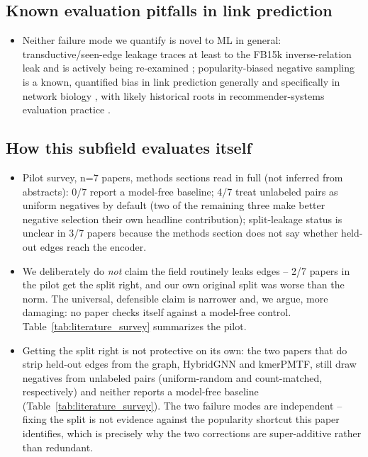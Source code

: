 \documentclass{bmcart}
\begin{document}
\subsection*{Known evaluation pitfalls in link prediction}
\begin{itemize}
\item Neither failure mode we quantify is novel to ML in general: transductive/seen-edge
leakage traces at least to the FB15k inverse-relation leak \cite{toutanova2015observed}
and is actively being re-examined \cite{zhu2023pitfalls,li2023evaluating};
popularity-biased negative sampling is a known, quantified bias in link prediction
generally \cite{kotnis2017analysis,aiyappa2024implicit} and specifically in network
biology \cite{yilmaz2025biasaware}, with likely historical roots in recommender-systems
evaluation practice \cite{krichene2020sampled}.
\end{itemize}

\subsection*{How this subfield evaluates itself}
\begin{itemize}
\item Pilot survey, n=7 papers, methods sections read in full (not inferred from
abstracts): 0/7 report a model-free baseline; 4/7 treat unlabeled pairs as uniform
negatives by default (two of the remaining three make better negative selection their
own headline contribution); split-leakage status is unclear in 3/7 papers because the
methods section does not say whether held-out edges reach the encoder.
\item We deliberately do \emph{not} claim the field routinely leaks edges -- 2/7 papers
in the pilot get the split right, and our own original split was worse than the norm.
The universal, defensible claim is narrower and, we argue, more damaging: no paper
checks itself against a model-free control. Table~\ref{tab:literature_survey}
summarizes the pilot.
\item Getting the split right is not protective on its own: the two papers that do
strip held-out edges from the graph, HybridGNN and kmerPMTF, still draw negatives from
unlabeled pairs (uniform-random and count-matched, respectively) and neither reports a
model-free baseline (Table~\ref{tab:literature_survey}). The two failure modes are
independent -- fixing the split is not evidence against the popularity shortcut this
paper identifies, which is precisely why the two corrections are super-additive rather
than redundant.
\end{itemize}
\end{document}
